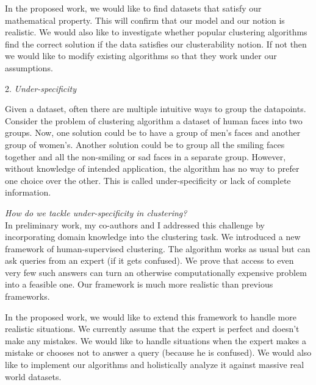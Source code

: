 \documentclass[12pt]{article}
\begin{document}
In the proposed work, we would like to find datasets that satisfy our mathematical property. This will confirm that our model and our notion is realistic. We would also like to investigate whether popular clustering algorithms find the correct solution if the data satisfies our clusterability notion. If not then we would like to modify existing algorithms so that they work under our assumptions. 

\vspace{0.05in} 2. \textit{Under-specificity}

Given a dataset, often there are multiple intuitive ways to group the datapoints. Consider the problem of clustering algorithm a dataset of human faces into two groups. Now, one solution could be to have a group of men's faces and another group of women's. Another solution could be to group all the smiling faces together and all the non-smiling or sad faces in a separate group. However, without knowledge of intended application, the algorithm has no way to prefer one choice over the other. This is called under-specificity or lack of complete information. %

\emph{How do we tackle under-specificity in clustering?}\\ 
In preliminary work, my co-authors and I addressed this challenge by incorporating domain knowledge into the clustering task. We introduced a new framework of human-supervised clustering. The algorithm works as usual but can ask queries from an expert (if it gets confused). We prove that access to even very few such answers can turn an otherwise computationally expensive problem into a feasible one. Our framework is much more realistic than previous frameworks. 

In the proposed work, we would like to extend this framework to handle more realistic situations. We currently assume that the expert is perfect and doesn't make any mistakes. We would like to handle situations when the expert makes a mistake or chooses not to answer a query (because he is confused). We would also like to implement our algorithms and holistically analyze it against massive real world datasets.
\end{document}
